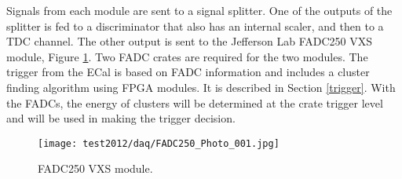 
Signals from each module are sent to a signal splitter. One of the outputs of the splitter is fed to a discriminator that also has an internal scaler, and then to a TDC channel. The other output is sent to the Jefferson Lab FADC250 VXS module, Figure \ref{fig:fadc}. Two FADC crates are required for the  two modules. The trigger from the ECal is based on FADC information and includes a cluster finding algorithm using FPGA modules. It is described in Section \ref{trigger}. With the FADCs, the energy of clusters will be determined at the crate trigger level and will be used in making the trigger decision.

\begin{figure}[t]
\texttt{[image: test2012/daq/FADC250\_Photo\_001.jpg]}
\caption{\small{FADC250 VXS module.}}\label{fig:fadc}
\end{figure}


